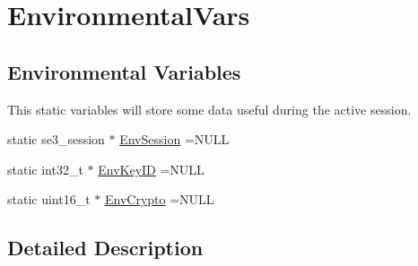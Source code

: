 \hypertarget{group___environmental_vars}{\section{Environmental\-Vars}
\label{group___environmental_vars}
}
\subsection*{Environmental Variables}
\label{_amgrp18655788b732518557d8f00a3758955b}%
This static variables will store some data useful during the active session. \begin{DoxyCompactItemize}
\item 
static se3\-\_\-session $\ast$ \hyperlink{group___environmental_vars_gad3215e338581ce95b76b3b84b928d744}{Env\-Session} =N\-U\-L\-L
\item 
static int32\-\_\-t $\ast$ \hyperlink{group___environmental_vars_ga7a8b4d6945f6a13f8683427dc7ab7a44}{Env\-Key\-I\-D} =N\-U\-L\-L
\item 
static uint16\-\_\-t $\ast$ \hyperlink{group___environmental_vars_ga328037c714e95e56186f9d5f0842adea}{Env\-Crypto} =N\-U\-L\-L
\end{DoxyCompactItemize}


\subsection{Detailed Description}


